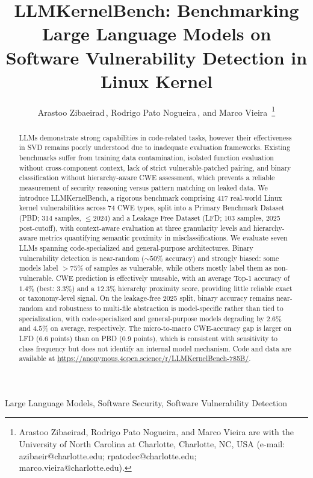 \documentclass[lettersize,journal]{IEEEtran}
\title{LLMKernelBench: Benchmarking Large Language Models on Software Vulnerability Detection in Linux Kernel}
\author{Arastoo Zibaeirad\,\orcidlink{0009-0003-4213-9940}, 
        Rodrigo Pato Nogueira\,\orcidlink{0009-0007-8486-3805}, 
        and Marco Vieira\,\orcidlink{0000-0001-5103-8541}
\thanks{Arastoo Zibaeirad, Rodrigo Pato Nogueira, and Marco Vieira are with the University of North Carolina at Charlotte, Charlotte, NC, USA (e-mail: azibaeir@charlotte.edu; rpatodec@charlotte.edu; marco.vieira@charlotte.edu).}}
\begin{document}
\maketitle

\begin{abstract}
        \glspl{LLM} demonstrate strong capabilities in code-related tasks, however their effectiveness in \gls{SVD} remains poorly understood due to inadequate evaluation frameworks. Existing benchmarks suffer from training data contamination, isolated function evaluation without cross-component context, lack of strict vulnerable-patched pairing, and binary classification without hierarchy-aware \gls{CWE} assessment, which prevents a reliable measurement of security reasoning versus pattern matching on leaked data. We introduce LLMKernelBench, a rigorous benchmark comprising 417 real-world Linux kernel vulnerabilities across 74 \gls{CWE} types, split into  a Primary Benchmark Dataset (PBD; 314 samples, $\leq$2024) and a Leakage Free Dataset (LFD; 103 samples, 2025 post-cutoff), with context-aware evaluation at three granularity levels and hierarchy-aware metrics quantifying semantic proximity in misclassifications. We evaluate seven \glspl{LLM} spanning code-specialized and general-purpose architectures. Binary vulnerability detection is near-random ($\sim 50\%$ accuracy) and strongly biased: some models label $>75\%$ of samples as vulnerable, while others mostly label them as non-vulnerable. \gls{CWE} prediction is effectively unusable, with an average Top-1 accuracy of $1.4\%$ (best: $3.3\%$) and a $12.3\%$ hierarchy proximity score, providing little reliable exact or taxonomy-level signal. On the leakage-free 2025 split, binary accuracy remains near-random and robustness to multi-file abstraction is model-specific rather than tied to specialization, with code-specialized and general-purpose models degrading by $2.6\%$ and $4.5\%$ on average, respectively. The micro-to-macro CWE-accuracy gap is larger on LFD ($6.6$ points) than on PBD ($0.9$ points), which is consistent with sensitivity to class frequency but does not identify an internal model mechanism. Code and data are available at \url{https://anonymous.4open.science/r/LLMKernelBench-785B/}.

\end{abstract}

\glsresetall

\begin{IEEEkeywords}
	Large Language Models, Software Security, Software Vulnerability Detection
\end{IEEEkeywords}
\end{document}
